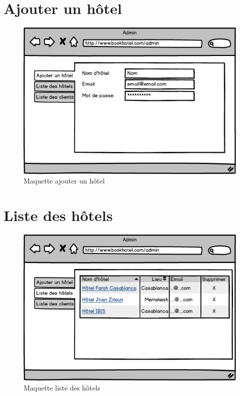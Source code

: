 \documentclass[12pt,a4paper]{report}
\begin{document}
	\section{Ajouter un hôtel}
	\begin{figure}[!hbtp]
		\centering
		\includegraphics[scale=0.5]{./graphics/12.png}
		\caption{Maquette ajouter un hôtel}
	\end{figure}
	
	\section{Liste des hôtels}
	\begin{figure}[!hbtp]
		\centering
		\includegraphics[scale=0.5]{./graphics/8.png}
		\caption{Maquette liste des hôtels}
	\end{figure}
\end{document}
